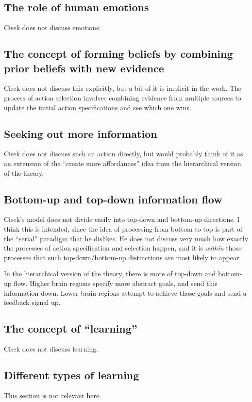 \documentclass[10pt,a4paper]{article}
\newcommand{\nquote}[1]{``{#1}''}
\begin{document}
\subsection{The role of human emotions}
Cisek does not discuss emotions.

\subsection{The concept of forming beliefs by combining prior beliefs with new evidence}
Cisek does not discuss this explicitly, but a bit of it is implicit in the work. The process of action selection involves combining evidence from multiple sources to update the initial action specifications and see which one wins.

\subsection{Seeking out more information}
Cisek does not discuss such an action directly, but would probably think of it as an extension of the \nquote{create more affordances} idea from the hierarchical version of the theory.

\subsection{Bottom-up and top-down information flow}
Cisek's model does not divide easily into top-down and bottom-up directions. I think this is intended, since the idea of processing from bottom to top is part of the \nquote{serial} paradigm that he dislikes. He does not discuss very much how exactly the processes of action specification and selection happen, and it is \emph{within} those processes that such top-down/bottom-up distinctions are most likely to appear.

In the hierarchical version of the theory, there is more of top-down and bottom-up flow. Higher brain regions specify more abstract goals, and send this information down. Lower brain regions attempt to achieve those goals and send a feedback signal up.

\subsection{The concept of \nquote{learning}}
Cisek does not discuss learning.

\subsection{Different types of learning}
This section is not relevant here.
\end{document}
